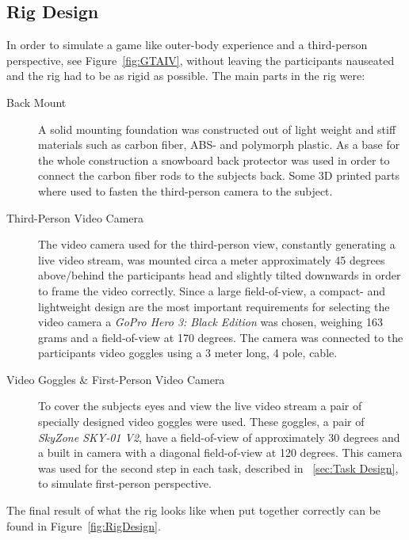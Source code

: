 \documentclass[runningheads,a4paper,oribibl]{llncs}
\begin{document}
\subsection{Rig Design}
In order to simulate a game like outer-body experience and a third-person perspective, see Figure~\ref{fig:GTAIV}, without leaving the participants nauseated and the rig had to be as rigid as possible. The main parts in the rig were:
\begin{description}

	\item[Back Mount] A solid mounting foundation was constructed out of light weight and stiff materials such as carbon fiber, ABS- and polymorph plastic. As a base for the whole construction a snowboard back protector was used in order to connect the carbon fiber rods to the subjects back. Some 3D printed parts where used to fasten the third-person camera to the subject.

	\item[Third-Person Video Camera] The video camera used for the third-person view, constantly generating a live video stream, was mounted circa a meter approximately 45 degrees above/behind the participants head and slightly tilted downwards in order to frame the video correctly. Since a large field-of-view, a compact- and lightweight design are the most important requirements for selecting the video camera a \emph{GoPro Hero 3: Black Edition} was chosen, weighing 163 grams and a field-of-view at 170 degrees. The camera was connected to the participants video goggles using a 3 meter long, 4 pole, cable.

	\item[Video Goggles & First-Person Video Camera] To cover the subjects eyes and view the live video stream a pair of specially designed video goggles were used. These goggles, a pair of \emph{SkyZone SKY-01 V2}, have a field-of-view of approximately 30 degrees and a built in camera with a diagonal field-of-view at 120 degrees. This camera was used for the second step in each task, described in ~\ref{sec:Task Design}, to simulate first-person perspective.
\end{description}
The final result of what the rig looks like when put together correctly can be found in Figure~\ref{fig:RigDesign}.
\end{document}
